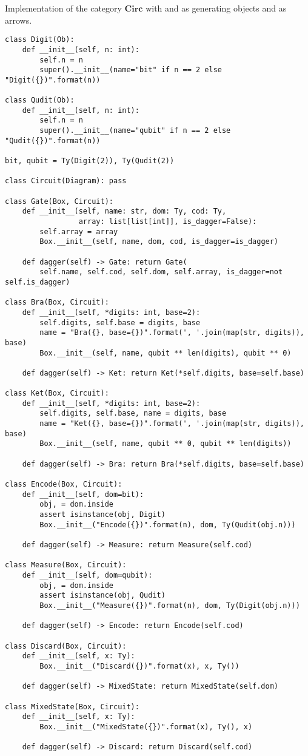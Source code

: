 \begin{python}
{\normalfont Implementation of the category $\mathbf{Circ}$ with  and  as generating objects and  as arrows.}

\begin{verbatim}
class Digit(Ob):
    def __init__(self, n: int):
        self.n = n
        super().__init__(name="bit" if n == 2 else "Digit({})".format(n))

class Qudit(Ob):
    def __init__(self, n: int):
        self.n = n
        super().__init__(name="qubit" if n == 2 else "Qudit({})".format(n))

bit, qubit = Ty(Digit(2)), Ty(Qudit(2))

class Circuit(Diagram): pass

class Gate(Box, Circuit):
    def __init__(self, name: str, dom: Ty, cod: Ty,
                 array: list[list[int]], is_dagger=False):
        self.array = array
        Box.__init__(self, name, dom, cod, is_dagger=is_dagger)

    def dagger(self) -> Gate: return Gate(
        self.name, self.cod, self.dom, self.array, is_dagger=not self.is_dagger)

class Bra(Box, Circuit):
    def __init__(self, *digits: int, base=2):
        self.digits, self.base = digits, base
        name = "Bra({}, base={})".format(', '.join(map(str, digits)), base)
        Box.__init__(self, name, qubit ** len(digits), qubit ** 0)

    def dagger(self) -> Ket: return Ket(*self.digits, base=self.base)

class Ket(Box, Circuit):
    def __init__(self, *digits: int, base=2):
        self.digits, self.base, name = digits, base
        name = "Ket({}, base={})".format(', '.join(map(str, digits)), base)
        Box.__init__(self, name, qubit ** 0, qubit ** len(digits))

    def dagger(self) -> Bra: return Bra(*self.digits, base=self.base)

class Encode(Box, Circuit):
    def __init__(self, dom=bit):
        obj, = dom.inside
        assert isinstance(obj, Digit)
        Box.__init__("Encode({})".format(n), dom, Ty(Qudit(obj.n)))

    def dagger(self) -> Measure: return Measure(self.cod)

class Measure(Box, Circuit):
    def __init__(self, dom=qubit):
        obj, = dom.inside
        assert isinstance(obj, Qudit)
        Box.__init__("Measure({})".format(n), dom, Ty(Digit(obj.n)))

    def dagger(self) -> Encode: return Encode(self.cod)

class Discard(Box, Circuit):
    def __init__(self, x: Ty):
        Box.__init__("Discard({})".format(x), x, Ty())

    def dagger(self) -> MixedState: return MixedState(self.dom)

class MixedState(Box, Circuit):
    def __init__(self, x: Ty):
        Box.__init__("MixedState({})".format(x), Ty(), x)

    def dagger(self) -> Discard: return Discard(self.cod)
\end{verbatim}
\end{python}

